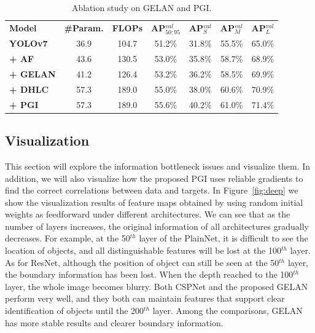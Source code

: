 \documentclass[10pt,twocolumn,letterpaper]{article}
\begin{document}
	\begin{table}[h]
		\centering
		\begin{threeparttable}[h]
			\footnotesize
			\caption{Ablation study on GELAN and PGI.}
			\label{table:yolo}
			\setlength\tabcolsep{3.0pt}
			\begin{tabular}{lcccccc}
				\toprule
				\textbf{Model} & \textbf{\#Param.} & \textbf{FLOPs} & \textbf{AP$^{val}_{50:95}$} & \textbf{AP$^{val}_{S}$} & \textbf{AP$^{val}_{M}$} & \textbf{AP$^{val}_{L}$} \\
				\textbf{YOLOv7~\cite{wang2023yolov7}} & 36.9 & 104.7 & 51.2\% & 31.8\% & 55.5\% & 65.0\% \\
				\textbf{+ AF~\cite{wang2023yolov7}} & 43.6 & 130.5 & 53.0\% & 35.8\% & 58.7\% & 68.9\% \\
				\textbf{+ GELAN} & 41.2 & 126.4 & 53.2\% & 36.2\% & 58.5\% & 69.9\% \\
				\textbf{+ DHLC~\cite{liang2021cbnetv2}} & 57.3 & 189.0 & 55.0\% & 38.0\% & 60.6\% & 70.9\% \\
				\textbf{+ PGI} & 57.3 & 189.0 & 55.6\% & 40.2\% & 61.0\% & 71.4\% \\
				\bottomrule
			\end{tabular}
		\end{threeparttable}
	\end{table}

	\subsection{Visualization}
	
	This section will explore the information bottleneck issues and visualize them.  In addition, we will also visualize how the proposed PGI uses reliable gradients to find the correct correlations between data and targets.  In Figure~\ref{fig:deep} we show the visualization results of feature maps obtained by using random initial weights as feedforward under different architectures.  We can see that as the number of layers increases, the original information of all architectures gradually decreases.  For example, at the 50$^{th}$ layer of the PlainNet, it is difficult to see the location of objects, and all distinguishable features will be lost at the 100$^{th}$ layer.  As for ResNet, although the position of object can still be seen at the 50$^{th}$ layer, the boundary information has been lost.  When the depth reached to the 100$^{th}$ layer, the whole image becomes blurry.  Both CSPNet and the proposed GELAN perform very well, and they both can maintain features that support clear identification of objects until the 200$^{th}$ layer.  Among the comparisons, GELAN has more stable results and clearer boundary information.
	
\end{document}
